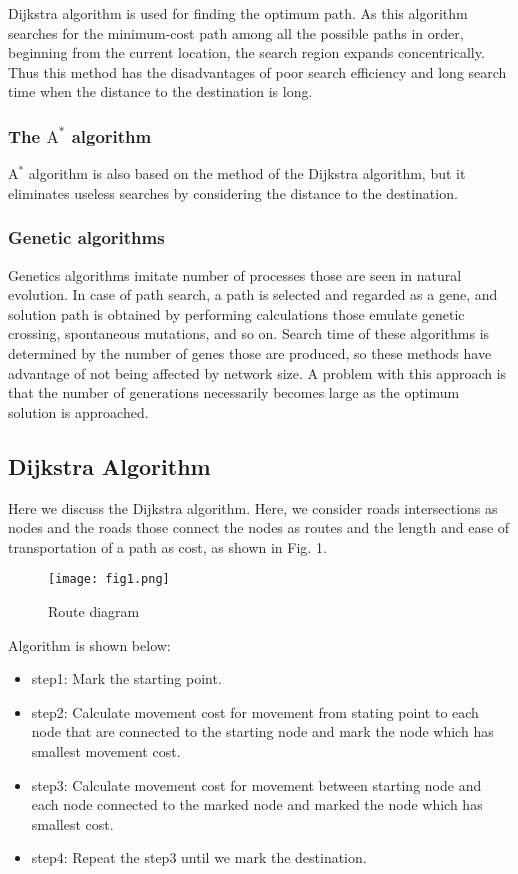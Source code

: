 \documentclass[conference]{IEEEtran}
\begin{document}
Dijkstra algorithm is used for finding the optimum path. As this algorithm searches for the minimum-cost path among all the possible paths in order, beginning from the current location, the search region expands concentrically. Thus this method has the disadvantages of poor search efficiency and long search time when the distance to the destination is long.

\subsubsection{The $\mathrm{A}^{*}$ algorithm}

$\mathrm{A}^{*}$ algorithm is also based on the method of the Dijkstra algorithm, but it eliminates useless searches by considering the distance to the destination.

\subsubsection{Genetic algorithms}

Genetics algorithms imitate number of processes those are seen in natural evolution. In case of path search, a path is selected and regarded as a gene, and solution path is obtained by performing calculations those emulate genetic crossing, spontaneous mutations, and so on. Search time of these algorithms is determined by the number of genes those are produced, so these methods have advantage of not being affected by network size. A problem with this approach is that the number of generations necessarily becomes large as the optimum solution is approached.

\subsection{Dijkstra Algorithm }

Here we discuss the Dijkstra algorithm. Here, we consider roads intersections as nodes and the roads those connect the nodes as routes and the length and ease of transportation of a path as cost, as shown in Fig. 1.

\begin{figure}[htbp]
\centerline{\texttt{[image: fig1.png]}}
\caption{Route diagram}
\label{fig}
\end{figure}

Algorithm is shown below:

\begin{itemize}
    \item step1: Mark the starting point.
    
    \item step2: Calculate movement cost for movement from stating point to each node that are connected to the starting node and mark the node which has smallest movement cost.
    
    \item step3: Calculate movement cost for movement between starting node and each node connected to the marked node and marked the node which has smallest cost.
    
    \item step4: Repeat the step3 until we mark the destination.
\end{itemize}
\end{document}

